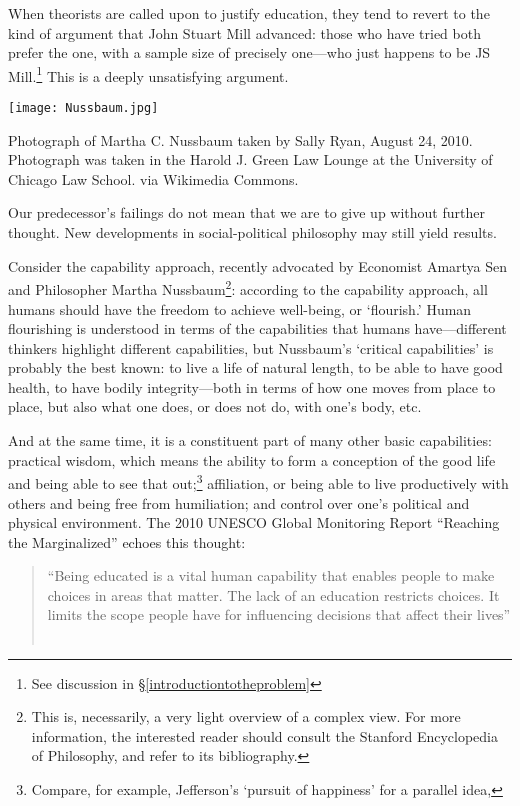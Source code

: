 When theorists are called upon to justify education, they tend to revert to the kind of argument that John Stuart Mill advanced: those who have tried both prefer the one, with a sample size of precisely one---who just happens to be JS Mill.\footnote{See discussion in \S \ref{introductiontotheproblem}} This is a deeply unsatisfying argument.

\begin{marginfigure}\texttt{[image: Nussbaum.jpg]}\caption{Photograph of Martha C. Nussbaum taken by Sally Ryan, August 24, 2010. Photograph was taken in the Harold J. Green Law Lounge at the University of Chicago Law School. via Wikimedia Commons.}\label{fig:socrates}\end{marginfigure}Our predecessor's failings do not mean that we are to give up without further thought. New developments in social-political philosophy may still yield results.

Consider the capability approach, recently advocated by Economist Amartya Sen and Philosopher Martha Nussbaum\footnote{This is, necessarily, a very light overview of a complex view. For more information, the interested reader should consult the Stanford Encyclopedia of Philosophy, and refer to its bibliography.}: according to the capability approach, all humans should have the freedom to achieve well-being, or `flourish.' Human flourishing is understood in terms of the capabilities that humans have---different thinkers highlight different capabilities, but Nussbaum's `critical capabilities' is probably the best known: to live a life of natural length, to be able to have good health, to have bodily integrity---both in terms of how one moves from place to place, but also what one does, or does not do, with one's body, etc. 

 And at the same time, it is a constituent part of many other basic capabilities: practical wisdom, which means the ability to form a conception of the good life and being able to see that out;\footnote{Compare, for example, Jefferson's `pursuit of happiness' for a parallel idea,} affiliation, or being able to live productively with others and being free from humiliation; and control over one's political and physical environment. The 2010 UNESCO Global Monitoring Report ``Reaching the Marginalized'' echoes this thought: 

\begin{quote}

``Being educated is a vital human capability that enables people to make choices in areas that matter. The lack of an education restricts choices. It limits the scope people have for influencing decisions that affect their lives'' ~\citep[p. 136]{Global:vs}
\end{quote}

